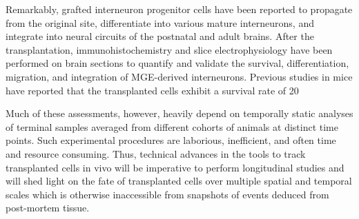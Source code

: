 Remarkably,  grafted interneuron progenitor cells have been reported to propagate from the  original site, differentiate into various mature interneurons, and integrate  into neural circuits of the postnatal and adult brains. After the  transplantation, immunohistochemistry and slice electrophysiology have been  performed on brain sections to quantify and validate the survival,  differentiation, migration, and integration of MGE-derived interneurons.  Previous studies in mice have reported that the transplanted cells exhibit a  survival rate of 20 %

Much of these  assessments, however, heavily depend on temporally static analyses of terminal  samples averaged from different cohorts of animals at distinct time points.  Such experimental procedures are laborious, inefficient, and often time and  resource consuming. Thus, technical advances in the tools to track transplanted  cells in vivo will be imperative to perform longitudinal studies and will shed  light on the fate of transplanted cells over multiple spatial and temporal  scales which is otherwise inaccessible from snapshots of events deduced from  post-mortem tissue.




